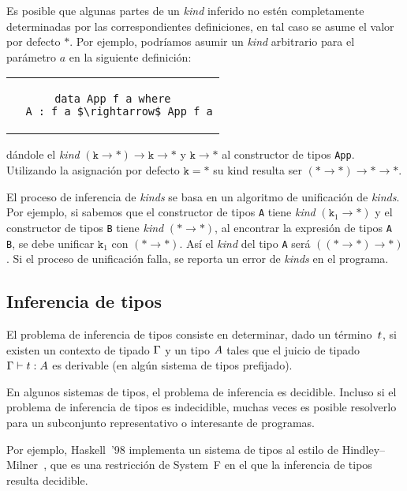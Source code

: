 Es posible que algunas partes de un {\em kind} inferido no estén completamente determinadas
por las correspondientes definiciones, en tal caso se asume el valor por defecto $*$.
Por ejemplo, podríamos asumir un {\em kind} arbitrario para el parámetro $a$ en la siguiente definición:
\begin{center}
\begin{tabular}{c}
\begin{lstlisting}[mathescape=true]
data App f a where
  A : f a $\rightarrow$ App f a
\end{lstlisting}
\end{tabular}
\end{center}
dándole el {\em kind} $(\mathtt{k} \rightarrow \mathtt{*}) \rightarrow \mathtt{k} \rightarrow \mathtt{*}$ y $\mathtt{k} \rightarrow \mathtt{*}$
al constructor de tipos \verb|App|.
Utilizando la asignación por defecto $\mathtt{k} = \mathtt{*}$
su kind resulta ser
$(\mathtt{*} \rightarrow \mathtt{*}) \rightarrow \mathtt{*} \rightarrow \mathtt{*}$.

El proceso de inferencia de {\em kinds} se basa en un algoritmo de
unificación de {\em kinds}.
Por ejemplo, si sabemos que el constructor de tipos
\verb|A| tiene {\em kind} $(\mathtt{k}_1 \rightarrow \mathtt{*})$
y el constructor de tipos
\verb|B| tiene {\em kind} $(\mathtt{*} \rightarrow \mathtt{*})$,
al encontrar la expresión de tipos \verb|A B|,
se debe unificar $\mathtt{k}_1$ con $(\mathtt{*} \rightarrow \mathtt{*})$.
Así el {\em kind} del tipo \verb|A| será
$((\mathtt{*} \rightarrow \mathtt{*}) \rightarrow \mathtt{*})$.
Si el proceso de unificación falla, se reporta un error de {\em kinds}
en el programa.

\subsection{Inferencia de tipos}

El problema de inferencia de tipos consiste en determinar, dado un término~$t$,
si existen un contexto de tipado $\Gamma$ y un tipo $A$ tales que el juicio
de tipado $\Gamma \vdash t : A$ es derivable (en algún sistema de tipos prefijado).

En algunos sistemas de tipos, el problema de inferencia es decidible.
Incluso si el problema de inferencia de tipos es indecidible,
muchas veces es posible resolverlo para un subconjunto representativo
o interesante de programas.

Por ejemplo, Haskell~'98 implementa un sistema de tipos al estilo de
Hindley--Milner~\cite{milner1978theory},
que es una restricción de System~F en el que la inferencia de tipos
resulta decidible.

